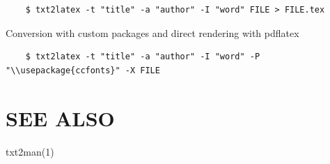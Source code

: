 \begin{verbatim}
    $ txt2latex -t "title" -a "author" -I "word" FILE > FILE.tex

\end{verbatim}
Conversion with custom packages and direct rendering with pdflatex

\begin{verbatim}
    $ txt2latex -t "title" -a "author" -I "word" -P "\\usepackage{ccfonts}" -X FILE

\end{verbatim}
\section{SEE ALSO}
txt2man(1)
